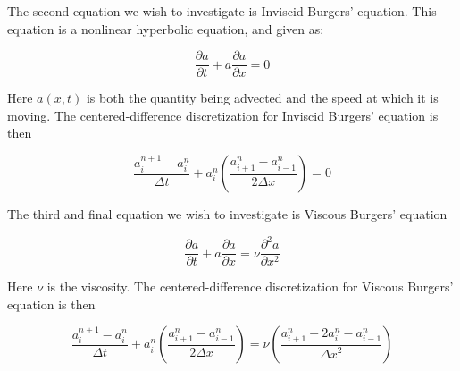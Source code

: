 \documentclass{article}
\begin{document}
The second equation we wish to investigate is Inviscid Burgers’ equation. This equation is a nonlinear hyperbolic equation, and given as:

\begin{equation}
 \frac{\partial a}{\partial t} + a \frac{\partial a}{\partial x} = 0
\end{equation}

Here $a(x,t)$ is both the quantity being advected and the speed at which it is moving. The centered-difference discretization for Inviscid Burgers' equation is then

\begin{equation}
 \frac{a_i^{n+1} - a_i^n}{\Delta t} +  a_i^n ( \frac{a_{i+1}^n - a_{i-1}^n}{2 \Delta x} ) = 0
\end{equation}

The third and final equation we wish to investigate is Viscous Burgers' equation

\begin{equation}
 \frac{\partial a}{\partial t} + a \frac{\partial a}{\partial x} = \nu \frac{\partial ^2 a}{\partial x^2} 
\end{equation}

Here $\nu$ is the viscosity. The centered-difference discretization for Viscous Burgers' equation is then

\begin{equation}
 \frac{a_i^{n+1} - a_i^n}{\Delta t} + a_i^n ( \frac{a_{i+1}^n - a_{i-1}^n}{2 \Delta x} ) = \nu (\frac{a_{i+1}^n - 2a_i^n - a_{i-1}^n}{{\Delta x}^2})
\end{equation}
\end{document}
